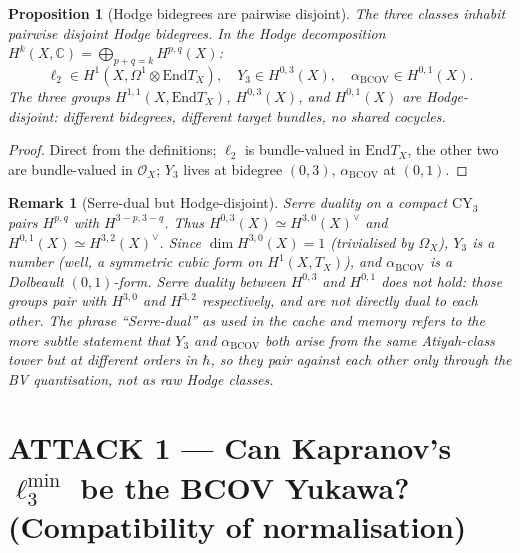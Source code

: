 \documentclass[11pt]{article}
\newtheorem{proposition}[theorem]{Proposition}
\newtheorem{remark}[theorem]{Remark}
\providecommand{\End}{\mathrm{End}}
\providecommand{\CY}{\mathrm{CY}}
\providecommand{\BCOV}{\mathrm{BCOV}}
\providecommand{\Om}{\Omega}
\providecommand{\cO}{\mathcal{O}}
\providecommand{\CC}{\mathbb{C}}
\begin{document}
\begin{proposition}[Hodge bidegrees are pairwise disjoint]
\label{prop:hodge-disjoint}
The three classes inhabit pairwise disjoint Hodge bidegrees. In the
Hodge decomposition $H^k(X, \CC) = \bigoplus_{p+q = k} H^{p,q}(X)$:
\[
  \ell_2 \in H^1(X, \Om^1 \otimes \End T_X), \quad
  Y_3 \in H^{0,3}(X), \quad
  \alpha_\BCOV \in H^{0,1}(X).
\]
The three groups $H^{1,1}(X, \End T_X)$, $H^{0,3}(X)$, and $H^{0,1}(X)$
are Hodge-disjoint: different bidegrees, different target bundles, no
shared cocycles.
\end{proposition}

\begin{proof}
Direct from the definitions; $\ell_2$ is bundle-valued in $\End T_X$,
the other two are bundle-valued in $\cO_X$; $Y_3$ lives at bidegree
$(0,3)$, $\alpha_\BCOV$ at $(0,1)$.
\end{proof}

\begin{remark}[Serre-dual but Hodge-disjoint]
\label{rem:serre-dual-not-coupled}
Serre duality on a compact $\CY_3$ pairs $H^{p,q}$ with $H^{3-p, 3-q}$.
Thus $H^{0,3}(X) \simeq H^{3,0}(X)^\vee$ and $H^{0,1}(X) \simeq
H^{3,2}(X)^\vee$. Since $\dim H^{3,0}(X) = 1$ (trivialised by $\Om_X$),
$Y_3$ is a number (well, a symmetric cubic form on $H^1(X,T_X)$), and
$\alpha_\BCOV$ is a Dolbeault $(0,1)$-form. Serre duality between
$H^{0,3}$ and $H^{0,1}$ does \emph{not} hold: those groups pair with
$H^{3,0}$ and $H^{3,2}$ respectively, and are not directly dual to each
other. The phrase ``Serre-dual'' as used in the cache and memory refers
to the more subtle statement that $Y_3$ and $\alpha_\BCOV$ both arise
from the same Atiyah-class tower but at different orders in $\hbar$, so
they pair against each other only through the BV quantisation, not as
raw Hodge classes.
\end{remark}

\section{ATTACK 1 --- Can Kapranov's $\ell_3^{\min}$ be the
BCOV Yukawa? (Compatibility of normalisation)}
\label{sec:attack-1}
\end{document}
